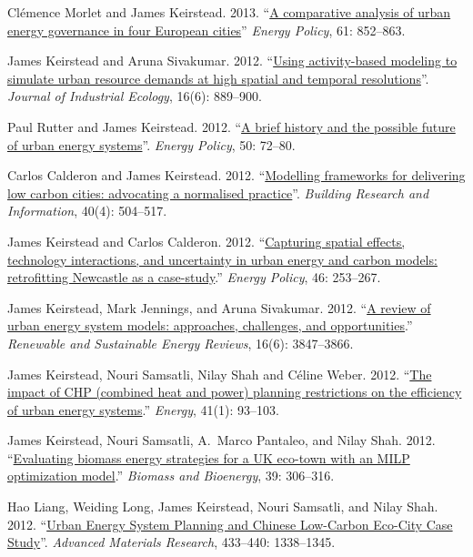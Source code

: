 \documentclass[11pt,a4paper]{article}
\begin{document}
\ind Clémence Morlet and James Keirstead. 2013. ``\href{http://dx.doi.org/10.1016/j.enpol.2013.06.085}{A comparative analysis of urban energy governance in four European cities}'' \emph{Energy Policy}, 61: 852--863.

\ind James Keirstead and Aruna Sivakumar. 2012. ``\href{http://dx.doi.org/10.1111/j.1530-9290.2012.00486.x}{Using activity-based modeling to simulate urban resource demands at high spatial and temporal resolutions}''. \emph{Journal of Industrial Ecology}, 16(6): 889--900.

\ind Paul Rutter and James Keirstead.  2012. ``\href{http://dx.doi.org/10.1016/j.enpol.2012.03.072}{A brief history and the possible future of urban energy systems}''. \emph{Energy Policy}, 50: 72--80.

\ind Carlos Calderon and James Keirstead. 2012. ``\href{http://dx.doi.org/10.1080/09613218.2012.680702}{Modelling frameworks for delivering low carbon cities: advocating a normalised practice}''. \emph{Building Research and Information}, 40(4): 504--517.

\ind James Keirstead and Carlos Calderon.  2012. ``\href{http://dx.doi.org/10.1016/j.enpol.2012.03.058}{Capturing spatial effects, technology interactions, and uncertainty in urban energy and carbon models: retrofitting Newcastle as a case-study}.''  \emph{Energy Policy}, 46: 253--267.

\ind James Keirstead, Mark Jennings, and Aruna Sivakumar. 2012. ``\href{http://dx.doi.org/10.1016/j.rser.2012.02.047}{A review of urban energy system models: approaches, challenges, and opportunities}.'' \emph{Renewable and Sustainable Energy Reviews}, 16(6): 3847--3866.

\ind James Keirstead, Nouri Samsatli, Nilay Shah and C\'{e}line Weber. 2012. ``\href{http://dx.doi.org/10.1016/j.energy.2011.06.011}{The impact of CHP (combined heat and power) planning restrictions on the efficiency of urban energy systems}.'' \emph{Energy}, 41(1): 93--103. 

\ind James Keirstead, Nouri Samsatli, A.\ Marco Pantaleo, and Nilay Shah. 2012. ``\href{http://dx.doi.org/10.1016/j.biombioe.2012.01.022}{Evaluating biomass energy strategies for a UK eco-town with an MILP optimization model}.'' \emph{Biomass and Bioenergy}, 39: 306--316.

\ind Hao Liang, Weiding Long, James Keirstead, Nouri Samsatli, and Nilay Shah. 2012. ``\href{http://dx.doi.org/10.4028/www.scientific.net/AMR.433-440.1338}{Urban Energy System Planning and Chinese Low-Carbon Eco-City Case Study}''. \emph{Advanced Materials Research}, 433--440: 1338--1345. 
\end{document}
